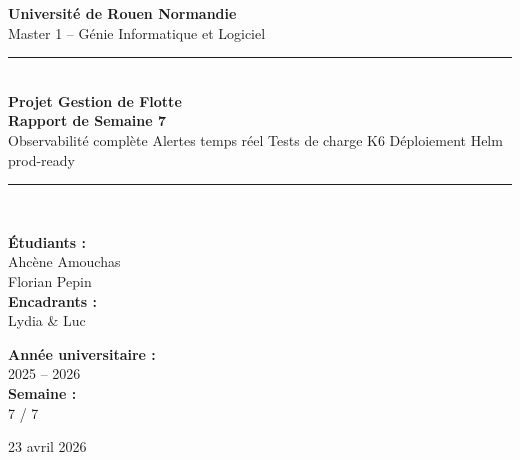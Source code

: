 \documentclass[12pt,a4paper]{article}
\begin{document}
\begin{titlepage}
  \centering
  \vspace*{1cm}

  {\Large\textbf{Universit\'{e} de Rouen Normandie}\\[0.3cm]
  \large Master 1 -- G\'{e}nie Informatique et Logiciel}

  \vspace{1.5cm}
  {\color{primary!55}\rule{\linewidth}{0.5mm}}\\[0.45cm]

  {\Huge\sffamily\bfseries\color{primary} Projet Gestion de Flotte\\[0.35cm]}
  {\LARGE\sffamily\bfseries\color{primary!80!black} Rapport de Semaine 7}\\[0.35cm]
  {\large\sffamily\color{primary!65!black}
    Observabilit\'{e} compl\`{e}te \textperiodcentered{}
    Alertes temps r\'{e}el \textperiodcentered{}
    Tests de charge K6 \textperiodcentered{}
    D\'{e}ploiement Helm prod-ready}

  {\color{primary!55}\rule{\linewidth}{0.5mm}}\\[1.5cm]

  \begin{minipage}{0.45\textwidth}
    \begin{flushleft}
      \textbf{\'{E}tudiants :}\\
      Ahc\`{e}ne Amouchas \\
      Florian Pepin \\[0.5cm]
      \textbf{Encadrants :}\\
      Lydia \& Luc
    \end{flushleft}
  \end{minipage}
  \hfill
  \begin{minipage}{0.45\textwidth}
    \begin{flushright}
      \textbf{Ann\'{e}e universitaire :}\\
      2025 -- 2026 \\[0.5cm]
      \textbf{Semaine :}\\
      7 / 7
    \end{flushright}
  \end{minipage}

  \vfill
  {\large 23 avril 2026}
\end{titlepage}

\tableofcontents
\newpage
\end{document}
